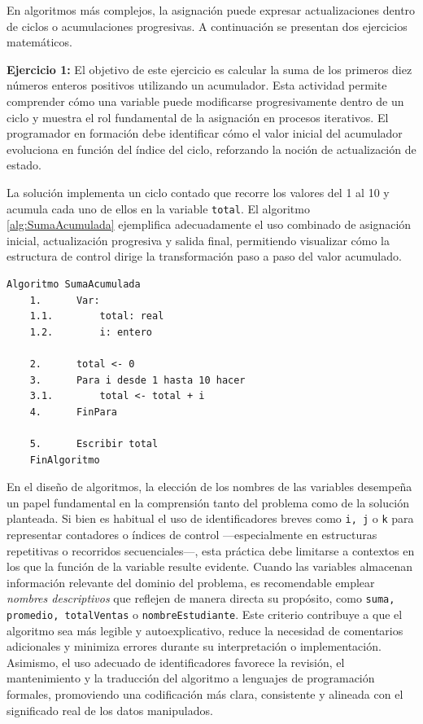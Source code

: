 \documentclass[12pt,twoside]{book}
\begin{document}
						\noindent
						En algoritmos más complejos, la asignación puede expresar actualizaciones dentro de ciclos o acumulaciones progresivas. A continuación se presentan dos ejercicios matemáticos.
						
						\textbf{Ejercicio 1:} El objetivo de este ejercicio es calcular la suma de los primeros diez números enteros positivos utilizando un acumulador. Esta actividad permite comprender cómo una variable puede modificarse progresivamente dentro de un ciclo y muestra el rol fundamental de la asignación en procesos iterativos. El programador en formación debe identificar cómo el valor inicial del acumulador evoluciona en función del índice del ciclo, reforzando la noción de actualización de estado.
						
						La solución implementa un ciclo contado que recorre los valores del 1 al 10 y acumula cada uno de ellos en la variable \texttt{total}. El algoritmo \ref{alg:SumaAcumulada} ejemplifica adecuadamente el uso combinado de asignación inicial, actualización progresiva y salida final, permitiendo visualizar cómo la estructura de control dirige la transformación paso a paso del valor acumulado.
				
				\begin{lstlisting}[style=upsamStyle,caption={Cálculo de una suma acumulada},label={alg:SumaAcumulada}]
	Algoritmo SumaAcumulada
	1. 		Var:
	1.1. 		total: real
	1.2. 		i: entero
	
	2.		total <- 0
	3.		Para i desde 1 hasta 10 hacer
	3.1.		total <- total + i
	4. 		FinPara
	
	5. 		Escribir total
	FinAlgoritmo \end{lstlisting}
						\noindent
						En el diseño de algoritmos, la elección de los nombres de las variables desempeña un papel fundamental en la comprensión tanto del problema como de la solución planteada. Si bien es habitual el uso de identificadores breves como \texttt{i, j} o \texttt{k} para representar contadores o índices de control —especialmente en estructuras repetitivas o recorridos secuenciales—, esta práctica debe limitarse a contextos en los que la función de la variable resulte evidente. Cuando las variables almacenan información relevante del dominio del problema, es recomendable emplear \textit{nombres descriptivos} que reflejen de manera directa su propósito, como \texttt{suma, promedio, totalVentas} o \texttt{nombreEstudiante}. Este criterio contribuye a que el algoritmo sea más legible y autoexplicativo, reduce la necesidad de comentarios adicionales y minimiza errores durante su interpretación o implementación. Asimismo, el uso adecuado de identificadores favorece la revisión, el mantenimiento y la traducción del algoritmo a lenguajes de programación formales, promoviendo una codificación más clara, consistente y alineada con el significado real de los datos manipulados.
						
\end{document}
